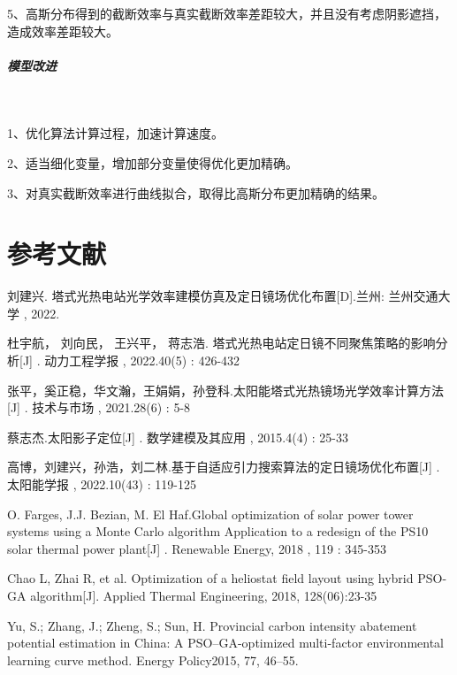 \documentclass{article}
\numberwithin{equation}{subsection}
\begin{document}
5、高斯分布得到的截断效率与真实截断效率差距较大，并且没有考虑阴影遮挡，造成效率差距较大。

\subparagraph{模型改进}~

1、优化算法计算过程，加速计算速度。

2、适当细化变量，增加部分变量使得优化更加精确。

3、对真实截断效率进行曲线拟合，取得比高斯分布更加精确的结果。


{\centering\section{参考文献}}
\begingroup  %
\renewcommand{\section}[2]{}
\begin{thebibliography}{99}
    
刘建兴. 塔式光热电站光学效率建模仿真及定日镜场优化布置[D].兰州: 兰州交通大学 , 2022.

杜宇航， 刘向民， 王兴平， 蒋志浩. 塔式光热电站定日镜不同聚焦策略的影响分析[J] . 动力工程学报 , 2022.40(5) : 426-432

张平，奚正稳，华文瀚，王娟娟，孙登科.太阳能塔式光热镜场光学效率计算方法[J] . 技术与市场 , 2021.28(6) : 5-8

蔡志杰.太阳影子定位[J] . 数学建模及其应用 , 2015.4(4) : 25-33

高博，刘建兴，孙浩，刘二林.基于自适应引力搜索算法的定日镜场优化布置[J] . 太阳能学报 , 2022.10(43) : 119-125

O. Farges, J.J. Bezian, M. El Haf.Global optimization of solar power tower systems using a Monte Carlo algorithm Application to a redesign of the PS10 solar thermal power plant[J] . Renewable Energy, 2018 , 119 : 345-353

Chao L, Zhai R, et al. Optimization of a heliostat field layout using hybrid PSO-GA algorithm[J].
Applied Thermal Engineering, 2018, 128(06):23-35

Yu, S.; Zhang, J.; Zheng, S.; Sun, H. Provincial carbon intensity abatement potential estimation in China:
A PSO–GA-optimized multi-factor environmental learning curve method. Energy Policy2015, 77, 46–55.


\end{thebibliography}
\endgroup
\end{document}
